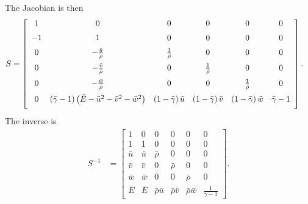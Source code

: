 The Jacobian is then
\begin{align}
S &= 
\left[\begin{array}{cccccc}
    1      %
  & 0      %
  & 0      %
  & 0      %
  & 0      %
  & 0      %
  \\ \noalign{\medskip}
   -1      %
  & 1      %
  & 0      %
  & 0      %
  & 0      %
  & 0      %
  \\ \noalign{\medskip}
    0                                %
  & - \frac{\bar{u}}{\bar{\rho}}     %
  & \frac{1}{\bar{\rho}}             %
  & 0                                %
  & 0                                %
  & 0                                %
  \\ \noalign{\medskip}
    0                                %
  & - \frac{\bar{v}}{\bar{\rho}}     %
  & 0                                %
  & \frac{1}{\bar{\rho}}             %
  & 0                                %
  & 0                                %
  \\ \noalign{\medskip}
    0                                %
  & - \frac{\bar{w}}{\bar{\rho}}     %
  & 0                                %
  & 0                                %
  & \frac{1}{\bar{\rho}}             %
  & 0                                %
  \\ \noalign{\medskip}
    0                                           %
  & \left(\bar{\gamma} - 1\right) \left(\bar{E} - \bar{u}^2 - \bar{v}^2 - \bar{w}^2\right) %
  & \left(1 - \bar{\gamma}\right) \bar{u}       %
  & \left(1 - \bar{\gamma}\right) \bar{v}       %
  & \left(1 - \bar{\gamma}\right) \bar{w}       %
  & \bar{\gamma}-1                              %
  \\ \noalign{\medskip}
\end{array}\right]
.
\end{align}
%
The inverse is
\begin{align}
S^{-1} &= \left[\begin{array}{cccccc}
  1         & 0         & 0          & 0            & 0            & 0 \\
  1         & 1         & 0          & 0            & 0            & 0 \\
  \bar{u}   & \bar{u}   & \bar{\rho} & 0            & 0            & 0 \\
  \bar{v}   & \bar{v}   & 0          & \bar{\rho}   & 0            & 0 \\
  \bar{w}   & \bar{w}   & 0          & 0            & \bar{\rho}   & 0 \\
  \bar{E}
& \bar{E} 
& \bar{\rho} \bar{u} 
& \bar{\rho} \bar{v} 
& \bar{\rho} \bar{w} 
& \frac{1}{\bar{\gamma}-1}
\end{array}\right]
.
\end{align}

